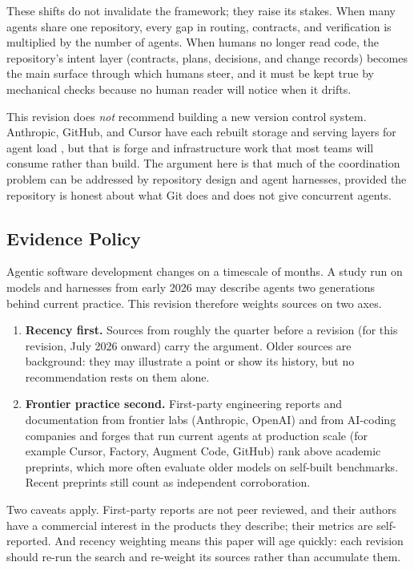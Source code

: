 \documentclass[11pt]{article}
\begin{document}
These shifts do not invalidate the framework; they raise its stakes. When many agents share one repository, every gap in routing, contracts, and verification is multiplied by the number of agents. When humans no longer read code, the repository's intent layer (contracts, plans, decisions, and change records) becomes the main surface through which humans steer, and it must be kept true by mechanical checks because no human reader will notice when it drifts.

This revision does \emph{not} recommend building a new version control system. Anthropic, GitHub, and Cursor have each rebuilt storage and serving layers for agent load \cite{anthropic2026scion,celenza2026gitinfra,marti2026gitscale}, but that is forge and infrastructure work that most teams will consume rather than build. The argument here is that much of the coordination problem can be addressed by repository design and agent harnesses, provided the repository is honest about what Git does and does not give concurrent agents.

\subsection{Evidence Policy}
Agentic software development changes on a timescale of months. A study run on models and harnesses from early 2026 may describe agents two generations behind current practice. This revision therefore weights sources on two axes.

\begin{enumerate}[leftmargin=*]
  \item \textbf{Recency first.} Sources from roughly the quarter before a revision (for this revision, July 2026 onward) carry the argument. Older sources are background: they may illustrate a point or show its history, but no recommendation rests on them alone.
  \item \textbf{Frontier practice second.} First-party engineering reports and documentation from frontier labs (Anthropic, OpenAI) and from AI-coding companies and forges that run current agents at production scale (for example Cursor, Factory, Augment Code, GitHub) rank above academic preprints, which more often evaluate older models on self-built benchmarks. Recent preprints still count as independent corroboration.
\end{enumerate}

Two caveats apply. First-party reports are not peer reviewed, and their authors have a commercial interest in the products they describe; their metrics are self-reported. And recency weighting means this paper will age quickly: each revision should re-run the search and re-weight its sources rather than accumulate them.
\end{document}
